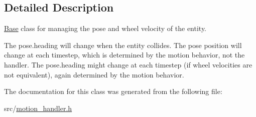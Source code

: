 \subsection{Detailed Description}
\hyperlink{classBase}{Base} class for managing the pose and wheel velocity of the entity. 

The pose.\+heading will change when the entity collides. The pose position will change at each timestep, which is determined by the motion behavior, not the handler. The pose.\+heading might change at each timestep (if wheel velocities are not equivalent), again determined by the motion behavior. 

The documentation for this class was generated from the following file\+:\begin{DoxyCompactItemize}
\item 
src/\hyperlink{motion__handler_8h}{motion\+\_\+handler.\+h}\end{DoxyCompactItemize}
